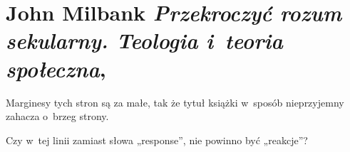 \documentclass[a4paper,11pt]{article}
\numberwithin{equation}{section}
\begin{document}
\VerSpaceTwo
























\section{John Milbank \textit{Przekroczyć rozum sekularny.
    Teologia i~teoria społeczna},
  \parencite{MilbankPrzekroczycRozumSekularny2020}}

\vspace{0em}



\vspace{0em}


\noindent
{} Marginesy tych stron są za małe, tak że tytuł książki
w~sposób nieprzyjemny zahacza o~brzeg strony.

\VerSpaceFour





\noindent
{} Czy w~tej linii zamiast słowa „response”, nie powinno
być „reakcje”?

\VerSpaceFour





\end{document}
